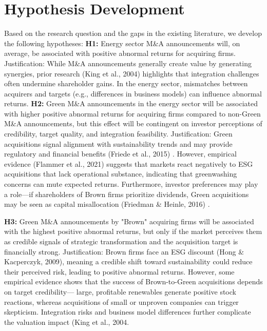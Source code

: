 \documentclass[a4paper]{article}
\begin{document}
\section{Hypothesis Development}
Based on the research question and the gaps in the existing literature, we develop the following hypotheses:
\bigbreak
\textbf{H1:} Energy sector M\&A announcements will, on average, be associated with positive abnormal returns for acquiring firms.
\smallbreak
Justification:
While M\&A announcements generally create value by generating synergies, prior research (King et al., 2004)\autocite{king2004} highlights that integration challenges often undermine shareholder gains. In the energy sector, mismatches between acquirers and targets (e.g., differences in business models) can influence abnormal returns.
\bigbreak
\textbf{H2:} Green M\&A announcements in the energy sector will be associated with higher positive abnormal returns for acquiring firms compared to non-Green M\&A announcements, but this effect will be contingent on investor perceptions of credibility, target quality, and integration feasibility.
\smallbreak
Justification:
Green acquisitions signal alignment with sustainability trends and may provide regulatory and financial benefits (Friede et al., 2015) \autocite{friede2015}. However, empirical evidence (Flammer et al., 2021) \autocite{flammer2021} suggests that markets react negatively to ESG acquisitions that lack operational substance, indicating that greenwashing concerns can mute expected returns. Furthermore, investor preferences may play a role—if shareholders of Brown firms prioritize dividends, Green acquisitions may be seen as capital misallocation (Friedman \& Heinle, 2016) \autocite{friedman2016disclosure}.

\bigbreak
\textbf{H3:} Green M\&A announcements by "Brown" acquiring firms will be associated with the highest positive abnormal returns, but only if the market perceives them as credible signals of strategic transformation and the acquisition target is financially strong.
\smallbreak
Justification:
Brown firms face an ESG discount (Hong \& Kacperczyk, 2009)\autocite{hong2009}, meaning a credible shift toward sustainability could reduce their perceived risk, leading to positive abnormal returns. However, some empirical evidence shows that the success of Brown-to-Green acquisitions depends on target credibility— large, profitable renewables generate positive stock reactions, whereas acquisitions of small or unproven companies can trigger skepticism. Integration risks and business model differences further complicate the valuation impact (King et al., 2004\autocite{king2004}.
\end{document}
